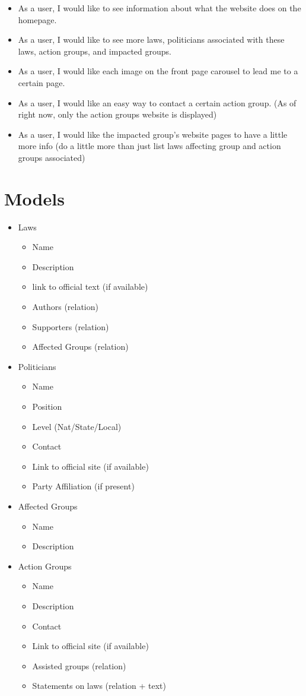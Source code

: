 \documentclass[12pt]{article}
\begin{document}
\begin{itemize}
	\item As a user, I would like to see information about what the website does on the homepage.
	\item As a user, I would like to see more laws, politicians associated with these laws, action groups, and impacted groups.
	\item As a user, I would like each image on the front page carousel to lead me to a certain page. 
	\item As a user, I would like an easy way to contact a certain action group. (As of right now, only the action groups website is displayed)
	\item As a user, I would like the impacted group's website pages to have a little more info (do a little more than just list laws affecting group and action groups associated)
\end{itemize}

\section{Models}

\begin{itemize}
	\item[] Laws
	\begin{itemize}
		\item Name
		\item Description
		\item link to official text (if available)
		\item Authors (relation)
		\item Supporters (relation)
		\item Affected Groups (relation)
	\end{itemize}
	\item[] Politicians
	\begin{itemize}
		\item Name
		\item Position
		\item Level (Nat/State/Local)
		\item Contact
		\item Link to official site (if available)
		\item Party Affiliation (if present)
	\end{itemize}
	\item[] Affected Groups
	\begin{itemize}
		\item Name
		\item Description
	\end{itemize}
	\item[] Action Groups
	\begin{itemize}
		\item Name
		\item Description
		\item Contact
		\item Link to official site (if available)
		\item Assisted groups (relation)
		\item Statements on laws (relation + text)
	\end{itemize}
\end{itemize}
\end{document}
